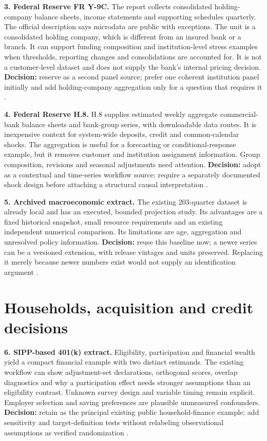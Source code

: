 \textbf{3. Federal Reserve FR Y-9C.} The report collects consolidated
holding-company balance sheets, income statements and supporting
schedules quarterly. The official description says microdata are public
with exceptions. The unit is a consolidated holding company, which is
different from an insured bank or a branch. It can support funding
composition and institution-level stress examples when thresholds,
reporting changes and consolidations are accounted for. It is not a
customer-level dataset and does not supply the bank's internal pricing
decision. \textbf{Decision:} reserve as a second panel source; prefer
one coherent institution panel initially and add holding-company
aggregation only for a question that requires it \citep{pd15_y9c}.

\textbf{4. Federal Reserve H.8.} H.8 supplies estimated weekly aggregate
commercial-bank balance sheets and bank-group series, with downloadable
data routes. It is inexpensive context for system-wide deposits, credit
and common-calendar shocks. The aggregation is useful for a forecasting
or conditional-response example, but it removes customer and institution
assignment information. Group composition, revisions and seasonal
adjustments need attention. \textbf{Decision:} adopt as a contextual and
time-series workflow source; require a separately documented shock
design before attaching a structural causal interpretation
\citep{pd15_h8}.

\textbf{5. Archived macroeconomic extract.} The existing 203-quarter
dataset is already local and has an executed, bounded projection study.
Its advantages are a fixed historical snapshot, small resource
requirements and an existing independent numerical comparison. Its
limitations are age, aggregation and unresolved policy information.
\textbf{Decision:} reuse this baseline now; a newer series can be a
versioned extension, with release vintages and units preserved.
Replacing it merely because newer numbers exist would not supply an
identification argument \citep{public_macrodata_dynamic}.

\hypertarget{households-acquisition-and-credit-decisions}{%
\section{Households, acquisition and credit
decisions}\label{households-acquisition-and-credit-decisions}}

\textbf{6. SIPP-based 401(k) extract.} Eligibility, participation and
financial wealth yield a compact financial example with two distinct
estimands. The existing workflow can show adjustment-set declarations,
orthogonal scores, overlap diagnostics and why a participation effect
needs stronger assumptions than an eligibility contrast. Unknown survey
design and variable timing remain explicit. Employer selection and
saving preferences are plausible unmeasured confounders.
\textbf{Decision:} retain as the principal existing public
household-finance example; add sensitivity and target-definition tests
without relabeling observational assumptions as verified randomization
\citep{public401k}.

